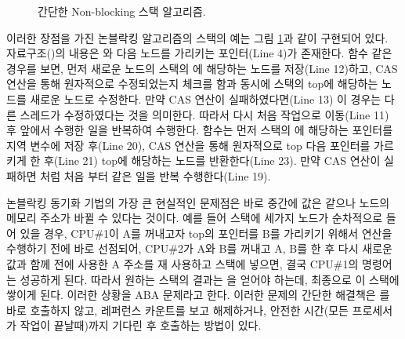 \begin{figure}[h!]
\begin{center}
\inputminted[linenos,fontsize=\footnotesize,
tabsize=4]{c}{src/lockfree_stack.c}
\end{center}
\caption{간단한 Non-blocking 스택 알고리즘.}
\label{fig:nonblockingstack}
\end{figure}


이러한 장점을 가진 논블락킹 알고리즘의 스택의 예는 그림 \ref{fig:nonblockingstack}과 같이
구현되어 있다.
자료구조()의 내용은 와 다음 노드를 가리키는 포인터(Line 4)가 존재한다.
 함수 같은 경우를 보면, 먼저 새로운 노드의 스택의 에 해당하는 노드를 저장(Line 12)하고, 
CAS 연산을 통해 원자적으로 수정되었는지 체크를 함과 동시에 스택의 top에 해당하는 노드를 새로운 노드로 수정한다.
만약 CAS 연산이 실패하였다면(Line 13) 이 경우는 다른 스레드가 수정하였다는 것을 의미한다.
따라서 다시 처음 작업으로 이동(Line 11) 후 앞에서 수행한 일을 반복하여 수행한다.
 함수는 먼저 스택의 에 해당하는 포인터를 지역 변수에 저장 후(Line 20), CAS 연산을 통해 
원자적으로 top 다음 포인터를 가르키게 한 후(Line 21) top에 해당하는 노드를 반환한다(Line 23). 
만약 CAS 연산이 실패하면  처럼 처음 부터 같은 일을 반복 수행한다(Line 19).

논블락킹 동기화 기법의 가장 큰 현실적인 문제점은 바로 중간에 값은 같으나 노드의 메모리 주소가 
바뀔 수 있다는 것이다. 
예를 들어 스택에 세가지 노드가 순차적으로 들어 있을 경우, 
CPU\#1이 A를 꺼내고자 top의 포인터를 B를 가리키기 위해서  연산을 
수행하기 전에 바로 선점되어,  
CPU\#2가 A와 B를 꺼내고 A, B를 한 후 다시 새로운 값과 함께 전에 사용한 A 주소를 재 사용하고 
스택에 넣으면, 결국 CPU\#1의  명령어는 성공하게 된다.
따라서 원하는 스택의 결과는 을 얻어야 하는데, 최종으로  이 스택에 쌓이게 된다.
이러한 상황을 ABA 문제라고 한다. 
이러한 문제의 간단한 해결책은 를 바로 호출하지 않고, 레퍼런스 카운트를 보고 해제하거나, 
안전한 시간(모든 프로세서가 작업이 끝날때)까지 기다린 후 호출하는 방법이 있다. 

